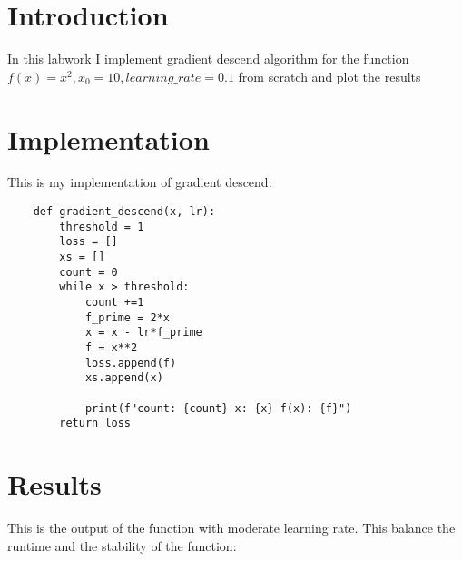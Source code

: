 \documentclass[hidelinks]{report}
\begin{document}
\chapter{Introduction}

\hspace{5mm} In this labwork I implement gradient descend algorithm for the function $f(x) = x^2, 
 x_0 = 10, learning\_rate = 0.1$ from scratch and plot the results

 
\chapter{Implementation}
\noindent This is my implementation of gradient descend:

\begin{verbatim}
    def gradient_descend(x, lr):
        threshold = 1
        loss = []
        xs = []
        count = 0
        while x > threshold:
            count +=1
            f_prime = 2*x
            x = x - lr*f_prime  
            f = x**2
            loss.append(f)
            xs.append(x)
            
            print(f"count: {count} x: {x} f(x): {f}")
        return loss
\end{verbatim}
\chapter{Results}

This is the output of the function with moderate learning rate. This balance the runtime and the stability of the function:
\end{document}

